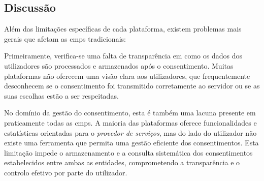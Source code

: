 \label{tab:cmp-caracteristicas}
\begin{table}[H]
\centering
\caption{Comparação das principais características das \acrshort{cmp}s existentes}
\end{table}


\subsection{Discussão}

Além das limitações específicas de cada plataforma, existem problemas mais gerais que afetam as \acrshort{cmp}s tradicionais:

Primeiramente, verifica-se uma falta de transparência em como os dados dos utilizadores são processados e armazenados após o consentimento. Muitas plataformas não oferecem uma visão clara aos utilizadores, que frequentemente desconhecem se o consentimento foi transmitido corretamente ao servidor ou se as suas escolhas estão a ser respeitadas.

No domínio da gestão do consentimento, esta é também uma lacuna presente em praticamente todas as \acrshort{cmp}s. A maioria das plataformas oferece funcionalidades e estatísticas orientadas para o \textit{provedor de serviços}, mas do lado do utilizador não existe uma ferramenta que permita uma gestão eficiente dos consentimentos. Esta limitação impede o armazenamento e a consulta sistemática dos consentimentos estabelecidos entre ambas as entidades, comprometendo a transparência e o controlo efetivo por parte do utilizador.

